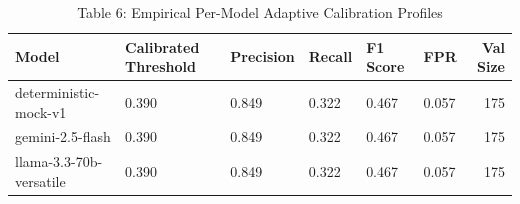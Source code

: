 \begin{table}
\caption{Table 6: Empirical Per-Model Adaptive Calibration Profiles}
\label{tab:table6_calibration_results}
\begin{tabular}{llllllr}
\toprule
Model & Calibrated Threshold & Precision & Recall & F1 Score & FPR & Val Size \\
\midrule
deterministic-mock-v1 & 0.390 & 0.849 & 0.322 & 0.467 & 0.057 & 175 \\
gemini-2.5-flash & 0.390 & 0.849 & 0.322 & 0.467 & 0.057 & 175 \\
llama-3.3-70b-versatile & 0.390 & 0.849 & 0.322 & 0.467 & 0.057 & 175 \\
\bottomrule
\end{tabular}
\end{table}
